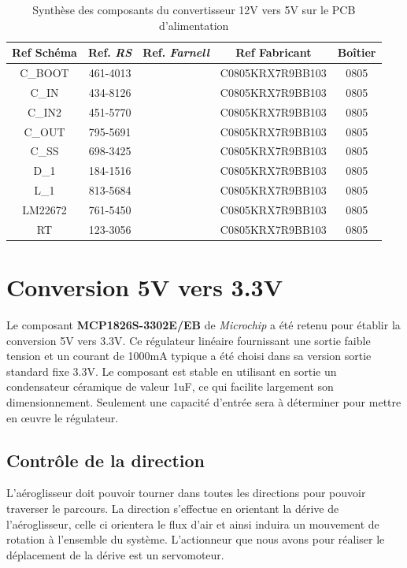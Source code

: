 \documentclass[a4paper,12pt]{book}
\begin{document}
				\begin{table}
					\begin{center}
						\begin{tabular}{|c|c|c|c|c|}
						\hline
						\textbf{Ref Schéma} & Ref. \textit{RS} & Ref. \textit{Farnell} & Ref Fabricant & Boîtier \\ 
						\hline
						C\_BOOT & 461-4013 & & C0805KRX7R9BB103 & 0805 \\
						\hline
						C\_IN & 434-8126 & & C0805KRX7R9BB103 & 0805 \\
						\hline
						C\_IN2 & 451-5770 & & C0805KRX7R9BB103 & 0805 \\
						\hline
						C\_OUT & 795-5691 & & C0805KRX7R9BB103 & 0805 \\
						\hline
						C\_SS & 698-3425 & & C0805KRX7R9BB103 & 0805 \\
						\hline
						D\_1 & 184-1516 & & C0805KRX7R9BB103 & 0805 \\
						\hline
						L\_1 & 813-5684 & & C0805KRX7R9BB103 & 0805 \\
						\hline
						LM22672 & 761-5450 & & C0805KRX7R9BB103 & 0805 \\
						\hline
						RT & 123-3056 & & C0805KRX7R9BB103 & 0805 \\
						\hline
						\end{tabular}
					\end{center}
					\caption{Synthèse des composants du convertisseur 12V vers 5V sur le PCB d'alimentation}
					\label{synth_composants}
				\end{table}
				
				
				
				
				
			
		\section{Conversion 5V vers 3.3V}
			
		Le composant \textbf{MCP1826S-3302E/EB} de \textit{Microchip} a été retenu pour établir la conversion 5V vers 3.3V. Ce régulateur linéaire fournissant une sortie faible tension et un courant de 1000mA typique a été choisi dans sa version sortie standard fixe 3.3V. Le composant est stable en utilisant en sortie un condensateur céramique de valeur 1uF, ce qui facilite largement son dimensionnement. Seulement une capacité d'entrée sera à déterminer pour mettre en œuvre le régulateur.
	
		\subsection{Contrôle de la direction}
			L'aéroglisseur doit pouvoir tourner dans toutes les directions pour pouvoir traverser le parcours. La direction s'effectue en orientant la dérive de l'aéroglisseur, celle ci orientera le flux d'air et ainsi induira un mouvement de rotation à l'ensemble du système. L'actionneur que nous avons pour réaliser le déplacement de la dérive est un servomoteur.
\end{document}
